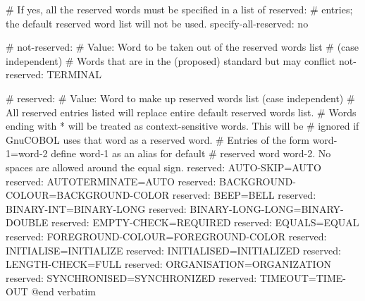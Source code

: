 # If yes, all the reserved words must be specified in a list of reserved:
# entries; the default reserved word list will not be used.
specify-all-reserved: no

# not-reserved:
# Value: Word to be taken out of the reserved words list
# (case independent)
# Words that are in the (proposed) standard but may conflict
not-reserved: TERMINAL

# reserved:
# Value: Word to make up reserved words list (case independent)
# All reserved entries listed will replace entire default reserved words list.
#   Words ending with * will be treated as context-sensitive words. This will be
# ignored if GnuCOBOL uses that word as a reserved word.
#   Entries of the form word-1=word-2 define word-1 as an alias for default
# reserved word word-2. No spaces are allowed around the equal sign.
reserved:	AUTO-SKIP=AUTO
reserved:	AUTOTERMINATE=AUTO
reserved:	BACKGROUND-COLOUR=BACKGROUND-COLOR
reserved:	BEEP=BELL
reserved:	BINARY-INT=BINARY-LONG
reserved:	BINARY-LONG-LONG=BINARY-DOUBLE
reserved:	EMPTY-CHECK=REQUIRED
reserved:	EQUALS=EQUAL
reserved:	FOREGROUND-COLOUR=FOREGROUND-COLOR
reserved:	INITIALISE=INITIALIZE
reserved:	INITIALISED=INITIALIZED
reserved:	LENGTH-CHECK=FULL
reserved:	ORGANISATION=ORGANIZATION
reserved:	SYNCHRONISED=SYNCHRONIZED
reserved:	TIMEOUT=TIME-OUT
@end verbatim

